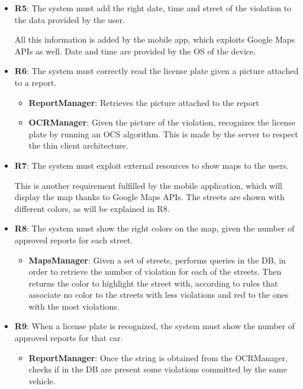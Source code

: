 \documentclass[12pt,a4paper]{report}
\begin{document}
\begin{itemize}
	\item\textbf{R5}: The system must add the right date, time and street of the violation to the data provided by the user.

		All this information is added by the mobile app, which exploits Google Maps APIs as well. Date and time are provided by the OS of the device.
		
	\item\textbf{R6}: The system must correctly read the license plate given a picture attached to a report.
		\begin{itemize}
		\item\textbf{ReportManager}: Retrieves the picture attached to the report
		\item\textbf{OCRManager}: Given the picture of the violation, recognizes the license plate by running an OCS algorithm. This is made by the server to
		respect the thin client architecture.
		\end{itemize}	
		
	\item\textbf{R7}: The system must exploit external resources to show maps to the users.

		This is another requirement fulfilled by the mobile application, which will display the map thanks to Google Maps APIs. The streets are shown with different colors, as will be explained in R8.
			
	\item\textbf{R8}: The system must show the right colors on the map, given the number of approved reports for each street.
		\begin{itemize}
		\item\textbf{MapsManager}: Given a set of streets, performs queries in the DB, in order to retrieve the number of violation for each of the streets. Then returns
		the color to highlight the street with, according to rules that associate no color to the streets with less violations and red to the ones with the most violations.
		\end{itemize}
			
	\item\textbf{R9}: When a license plate is recognized, the system must show the number of approved reports for that car.
		\begin{itemize}
		\item\textbf{ReportManager}: Once the string is obtained from the OCRManager, checks if in the DB are present some violations committed by the same vehicle. 
		\end{itemize}
			

\end{itemize}
\end{document}
